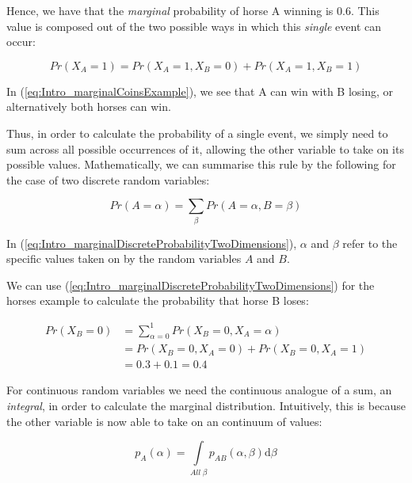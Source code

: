 \documentclass[11pt,fullpage]{book}
\begin{document}
Hence, we have that the \textit{marginal} probability of horse A winning is 0.6. This value is composed out of the two possible ways in which this \textit{single} event can occur:

\begin{equation}\label{eq:Intro_marginalCoinsExample}
Pr(X_A=1) = Pr(X_A=1,X_B=0) + Pr(X_A=1,X_B=1)
\end{equation}

In (\ref{eq:Intro_marginalCoinsExample}), we see that A can win with B losing, or alternatively both horses can win.

Thus, in order to calculate the probability of a single event, we simply need to sum across all possible occurrences of it, allowing the other variable to take on its possible values. Mathematically, we can summarise this rule by the following for the case of two discrete random variables:

\begin{equation}\label{eq:Intro_marginalDiscreteProbabilityTwoDimensions}
Pr(A=\alpha) = \sum\limits_{\beta} Pr(A=\alpha,B=\beta)
\end{equation}

In (\ref{eq:Intro_marginalDiscreteProbabilityTwoDimensions}), $\alpha$ and $\beta$ refer to the specific values taken on by the random variables $A$ and $B$. 

We can use (\ref{eq:Intro_marginalDiscreteProbabilityTwoDimensions}) for the horses example to calculate the probability that horse B loses:

\begin{equation}
\begin{align}
Pr(X_B=0) &= \sum\limits_{\alpha=0}^{1} Pr(X_B=0,X_A=\alpha)\\
&= Pr(X_B=0,X_A=0) + Pr(X_B=0,X_A=1)\\
&= 0.3 + 0.1 = 0.4
\end{align}
\end{equation}

For continuous random variables we need the continuous analogue of a sum, an \textit{integral}, in order to calculate the marginal distribution. Intuitively, this is because the other variable is now able to take on an continuum of values:

\begin{equation}\label{eq:Intro_marginalContinuousProbabilityTwoDimensions}
p_A(\alpha) = \int\limits_{All\;\beta} p_{AB}(\alpha,\beta) \mathrm{d}\beta
\end{equation}
\end{document}
